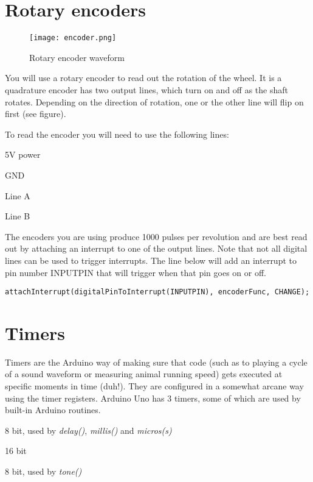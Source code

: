 \documentclass[a4paper,10pt]{article}
\begin{document}
\section{Rotary encoders}
\begin{figure}[here]
\texttt{[image: encoder.png]}
\caption{Rotary encoder waveform}
\end{figure}

You will use a rotary encoder to read out the rotation of the wheel. It is a quadrature encoder has 
two output lines, which turn on and off as the shaft rotates. Depending on the direction
of rotation, one or the other line will flip on first (see figure). 

To read the encoder you will need to use the following lines:

\begin{description}[align=right]
\item [BROWN] 5V power
\item [WHITE] GND
\item [GRAY] Line A
\item [GREEN] Line B
\end{description}

The encoders you are using produce 1000 pulses per revolution and are best read out by attaching
an interrupt to one of the output lines. Note that not all digital lines can be used to trigger
interrupts. The line below will add an interrupt to pin number INPUTPIN that will trigger
when that pin goes on or off.

\begin{lstlisting}
attachInterrupt(digitalPinToInterrupt(INPUTPIN), encoderFunc, CHANGE);
\end{lstlisting}

\section{Timers}
Timers are the Arduino way of making sure that code (such as to playing a cycle of a sound 
waveform or measuring animal running speed) gets executed at specific moments in time (duh!).
They are configured in a somewhat arcane way using the timer registers. Arduino Uno has 3 timers,
some of which are used by built-in Arduino routines.

\begin{description}[align=right]
\item [Timer0] 8 bit, used by \textit{delay()}, \textit{millis()} and \textit{micros(s)}
\item [Timer1] 16 bit
\item [Timer2] 8 bit, used by \textit{tone()}
\end{description}
\end{document}
